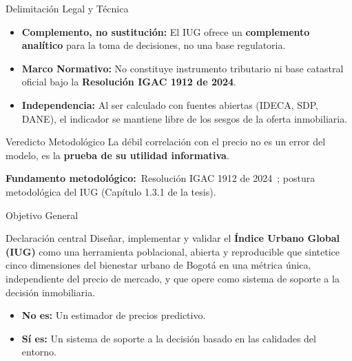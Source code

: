\documentclass[aspectratio=169,11pt]{beamer}
\newcommand{\hi}[1]{\textcolor{inmuGreen}{\textbf{#1}}}
\newcommand{\framenote}[1]{%
  \vfill
  {\scriptsize\color{inmuMuted}\textbf{Fundamento metodológico:}\ #1}%
}
\begin{document}
\begin{frame}{Delimitación Legal y Técnica}
  \begin{itemize}
    \item \textbf{Complemento, no sustitución:} El IUG ofrece un \hi{complemento analítico} para la toma de decisiones, no una base regulatoria.
    \item \textbf{Marco Normativo:} No constituye instrumento tributario ni base catastral oficial bajo la \hi{Resolución IGAC 1912 de 2024}.
    \item \textbf{Independencia:} Al ser calculado con fuentes abiertas (IDECA, SDP, DANE), el indicador se mantiene libre de los sesgos de la oferta inmobiliaria.
  \end{itemize}
  \begin{exampleblock}{Veredicto Metodológico}
    La débil correlación con el precio no es un error del modelo, es la \textbf{prueba de su utilidad informativa}.
  \end{exampleblock}
  \framenote{Resolución IGAC 1912 de 2024~\cite{IGAC1912}; postura metodológica del IUG (Capítulo 1.3.1 de la tesis).}
\end{frame}

\begin{frame}{Objetivo General}
  \begin{block}{Declaración central}
    Diseñar, implementar y validar el \hi{Índice Urbano Global (IUG)} como una herramienta poblacional, abierta y reproducible que sintetice cinco dimensiones del bienestar urbano de Bogotá en una métrica única, independiente del precio de mercado, y que opere como sistema de soporte a la decisión inmobiliaria.
  \end{block}
  \vspace{1em}
  \begin{itemize}
    \item \textbf{No es:} Un estimador de precios predictivo.
    \item \textbf{Sí es:} Un sistema de soporte a la decisión basado en las calidades del entorno.
  \end{itemize}
\end{frame}
\end{document}
